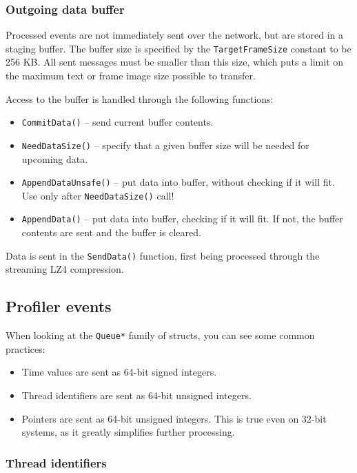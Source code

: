 \documentclass[hidelinks,titlepage,a4paper]{article}
\begin{document}
\subsubsection{Outgoing data buffer}

Processed events are not immediately sent over the network, but are stored in a staging buffer. The buffer size is specified by the \texttt{TargetFrameSize} constant to be 256 KB. All sent messages must be smaller than this size, which puts a limit on the maximum text or frame image size possible to transfer.

Access to the buffer is handled through the following functions:

\begin{itemize}
\item \texttt{CommitData()} -- send current buffer contents.
\item \texttt{NeedDataSize()} -- specify that a given buffer size will be needed for upcoming data.
\item \texttt{AppendDataUnsafe()} -- put data into buffer, without checking if it will fit. Use only after \texttt{NeedDataSize()} call!
\item \texttt{AppendData()} -- put data into buffer, checking if it will fit. If not, the buffer contents are sent and the buffer is cleared.
\end{itemize}

Data is sent in the \texttt{SendData()} function, first being processed through the streaming LZ4 compression.

\subsection{Profiler events}
\label{profilerevents}

When looking at the \texttt{Queue*} family of structs, you can see some common practices:

\begin{itemize}
\item Time values are sent as 64-bit signed integers.
\item Thread identifiers are sent as 64-bit unsigned integers.
\item Pointers are sent as 64-bit unsigned integers. This is true even on 32-bit systems, as it greatly simplifies further processing.
\end{itemize}

\subsubsection{Thread identifiers}
\end{document}
